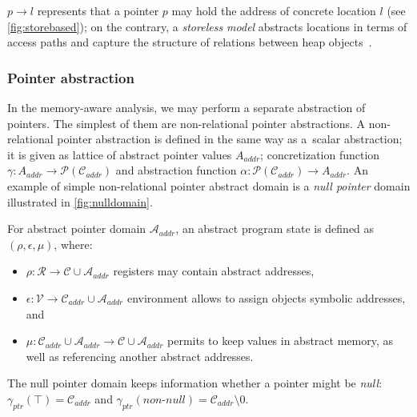 $p \rightarrow l$ represents that a pointer $p$ may hold the address of
concrete location $l$ (see \autoref{fig:storebased}); on the contrary, a
\emph{storeless model} abstracts locations in terms of access paths and capture
the structure of relations between heap objects~\cite{Kanvar2016}.

\subsubsection{Pointer abstraction}

In the memory-aware analysis, we may perform a separate abstraction of
pointers. The simplest of them are non-relational pointer abstractions. A
non-relational pointer abstraction is defined in the same way as a~scalar
abstraction; it is given as lattice of abstract pointer values
$A_{\textit{addr}}$; concretization function $\gamma\colon A_{\textit{addr}}
\to \mathcal{P}(\mathcal{C}_{\textit{addr}})$ and abstraction function $\alpha
\colon \mathcal{P}(\mathcal{C}_{\textit{addr}}) \to A _{\textit{addr}}$. An
example of simple non-relational pointer abstract domain is a \emph{null
pointer} domain illustrated in \autoref{fig:nulldomain}.

\newpage

\begin{definition}
    For abstract pointer domain $\mathcal{A}_{\textit{addr}}$, an abstract program state is
    defined as $(\rho, \epsilon, \mu)$, where:

    \begin{itemize}
        \itemsep0em
        \item $\rho \colon \mathcal{R} \to \mathcal{C} \cup
            \mathcal{A}_{\textit{addr}}$ registers may contain abstract
            addresses,
        \item $\epsilon \colon \mathcal{V} \to \mathcal{C}_{\textit{addr}}
            \cup \mathcal{A}_{\textit{addr}}$ environment allows to assign
            objects symbolic addresses, and
        \item $\mu \colon \mathcal{C}_{\textit{addr}} \cup
            \mathcal{A}_{\textit{addr}} \to \mathcal{C} \cup
            \mathcal{A}_{\textit{addr}}$ permits to keep values in abstract
            memory, as well as referencing another abstract addresses.
    \end{itemize}
\end{definition}

\begin{marginfigure}

    \centering
    \caption{The null pointer domain keeps information whether a pointer might be \emph{null}:
    $\gamma_{\textit{ptr}}(\top) = \mathcal{C}_{\textit{addr}}$ and
    $\gamma_{\textit{ptr}}(\textit{non-null}) = \mathcal{C}_{\textit{addr}} \setminus 0$. }
    \label{fig:nulldomain}
\end{marginfigure}

